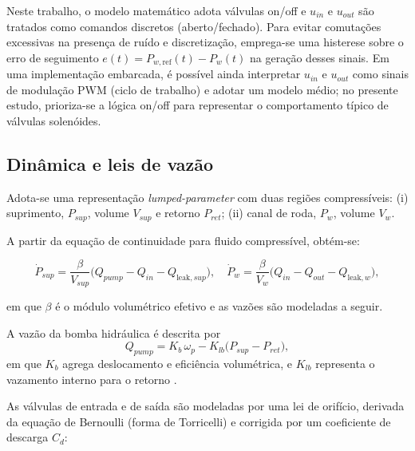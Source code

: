 Neste trabalho, o modelo matemático adota válvulas on/off e $u_{in}$ e $u_{out}$ são tratados como comandos discretos (aberto/fechado). Para evitar comutações excessivas na presença de ruído e discretização, emprega-se uma histerese sobre o erro de seguimento $e(t)=P_{w,\text{ref}}(t)-P_w(t)$ na geração desses sinais. Em uma implementação embarcada, é possível ainda interpretar $u_{in}$ e $u_{out}$ como sinais de modulação PWM (ciclo de trabalho) e adotar um modelo médio; no presente estudo, prioriza-se a lógica on/off para representar o comportamento típico de válvulas solenóides.

\subsection{Dinâmica e leis de vazão}
\label{sec:controle-modelo-hidraulico-2p}

Adota-se uma representação \emph{lumped-parameter} com duas regiões compressíveis: (i) suprimento, $P_{sup}$, volume $V_{sup}$ e retorno $P_{ret}$; (ii) canal de roda, $P_w$, volume $V_w$.

A partir da equação de continuidade para fluido compressível, obtém-se:

\begin{equation}
    \dot{P}_{sup} = \frac{\beta}{V_{sup}}\Big(Q_{pump} - Q_{in} - Q_{\text{leak},sup}\Big),
    \quad
    \dot{P}_{w} = \frac{\beta}{V_{w}}\Big(Q_{in} - Q_{out} - Q_{\text{leak},w}\Big),
    \label{eq:din_press}
\end{equation}

em que $\beta$ é o módulo volumétrico efetivo e as vazões são modeladas a seguir.

A vazão da bomba hidráulica é descrita por
\begin{equation}
    Q_{pump} = K_b\,\omega_p - K_{lb}\big(P_{sup}-P_{ret}\big),
    \label{eq:qpump_2p}
\end{equation}
em que $K_b$ agrega deslocamento e eficiência volumétrica, e $K_{lb}$ representa o vazamento interno para o retorno \cite{MotorParametricDesign2023,WangBingbing2015}.

As válvulas de entrada e de saída são modeladas por uma lei de orifício, derivada da equação de Bernoulli (forma de Torricelli) e corrigida por um coeficiente de descarga $C_d$:

